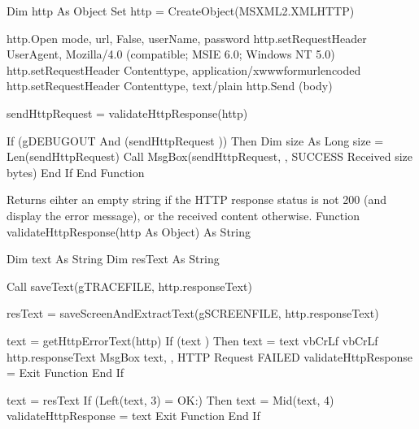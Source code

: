 \documentclass[letterpaper,10pt,english]{sphinxmanual}
\begin{document}
\begin{sphinxVerbatim}[commandchars=\\\{\}]
      Dim http As Object
      Set http = CreateObject(\PYGZdq{}MSXML2.XMLHTTP\PYGZdq{})

      http.Open mode, url, False, userName, password
      http.setRequestHeader \PYGZdq{}User\PYGZhy{}Agent\PYGZdq{}, \PYGZdq{}Mozilla/4.0 (compatible; MSIE 6.0; Windows NT 5.0)\PYGZdq{}
      \PYGZsq{}   http.setRequestHeader \PYGZdq{}Content\PYGZhy{}type\PYGZdq{}, \PYGZdq{}application/x\PYGZhy{}www\PYGZhy{}form\PYGZhy{}urlencoded\PYGZdq{}
      http.setRequestHeader \PYGZdq{}Content\PYGZhy{}type\PYGZdq{}, \PYGZdq{}text/plain\PYGZdq{}
      http.Send (body)

      sendHttpRequest = validateHttpResponse(http)

      If (g\PYGZus{}DEBUG\PYGZus{}OUT And (sendHttpRequest \PYGZlt{}\PYGZgt{} \PYGZdq{}\PYGZdq{})) Then
            Dim size As Long
            size = Len(sendHttpRequest)
            Call MsgBox(sendHttpRequest, , \PYGZdq{}SUCCESS \PYGZhy{} Received \PYGZdq{} \PYGZam{} size \PYGZam{} \PYGZdq{} bytes\PYGZdq{})
      End If
End Function


\PYGZsq{} Returns eihter an empty string if the HTTP response status is not 200 (and display the error message),
\PYGZsq{} or the received content otherwise.
\PYGZsq{}
Function validateHttpResponse(http As Object) As String

      Dim text As String
      Dim resText As String

      Call saveText(g\PYGZus{}TRACE\PYGZus{}FILE, http.responseText)

      resText = saveScreenAndExtractText(g\PYGZus{}SCREEN\PYGZus{}FILE, http.responseText)

      text = getHttpErrorText(http)
      If (text \PYGZlt{}\PYGZgt{} \PYGZdq{}\PYGZdq{}) Then
            text = text \PYGZam{} vbCrLf \PYGZam{} \PYGZdq{}\PYGZus{}\PYGZus{}\PYGZus{}\PYGZus{}\PYGZus{}\PYGZus{}\PYGZus{}\PYGZus{}\PYGZus{}\PYGZus{}\PYGZus{}\PYGZus{}\PYGZus{}\PYGZus{}\PYGZus{}\PYGZus{}\PYGZus{}\PYGZus{}\PYGZus{}\PYGZus{}\PYGZus{}\PYGZus{}\PYGZus{}\PYGZus{}\PYGZus{}\PYGZus{}\PYGZus{}\PYGZus{}\PYGZus{}\PYGZus{}\PYGZus{}\PYGZus{}\PYGZus{}\PYGZus{}\PYGZus{}\PYGZus{}\PYGZus{}\PYGZdq{} \PYGZam{} vbCrLf \PYGZam{} http.responseText
            MsgBox text, , \PYGZdq{}HTTP Request FAILED\PYGZdq{}
            validateHttpResponse = \PYGZdq{}\PYGZdq{}
            Exit Function
      End If

      text = resText
      If (Left(text, 3) = \PYGZdq{}OK:\PYGZdq{}) Then
            text = Mid(text, 4)
            validateHttpResponse = text
            Exit Function
      End If


\end{sphinxVerbatim}
\end{document}
